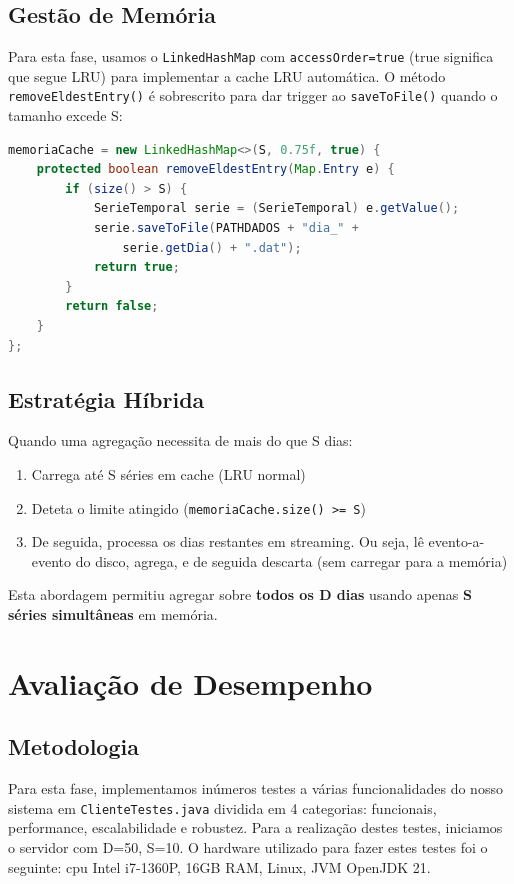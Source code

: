 \documentclass[11pt,a4paper]{article}
\begin{document}
\subsection{Gestão de Memória}

Para esta fase, usamos o \texttt{LinkedHashMap} com \texttt{accessOrder=true} (true significa que segue LRU) para implementar a cache LRU automática. O método \texttt{removeEldestEntry()} é sobrescrito para dar trigger ao \texttt{saveToFile()} quando o tamanho excede S:

\begin{lstlisting}[language=Java]
memoriaCache = new LinkedHashMap<>(S, 0.75f, true) {
    protected boolean removeEldestEntry(Map.Entry e) {
        if (size() > S) {
            SerieTemporal serie = (SerieTemporal) e.getValue();
            serie.saveToFile(PATHDADOS + "dia_" + 
                serie.getDia() + ".dat");
            return true;
        }
        return false;
    }
};
\end{lstlisting}

\subsection{Estratégia Híbrida}

Quando uma agregação necessita de mais do que S dias:
\begin{enumerate}[noitemsep]
    \item Carrega até S séries em cache (LRU normal)
    \item Deteta o limite atingido (\texttt{memoriaCache.size() >= S})
    \item De seguida, processa os dias restantes em streaming. Ou seja, lê evento-a-evento do disco, agrega, e de seguida descarta (sem carregar para a memória)
\end{enumerate}

Esta abordagem permitiu agregar sobre \textbf{todos os D dias} usando apenas \textbf{S séries simultâneas} em memória.

\section{Avaliação de Desempenho}

\subsection{Metodologia}

Para esta fase, implementamos inúmeros testes a várias funcionalidades do nosso sistema em \texttt{ClienteTestes.java} dividida em 4 categorias: funcionais, performance, escalabilidade e robustez. Para a realização destes testes, iniciamos o servidor com D=50, S=10. O hardware utilizado para fazer estes testes foi o seguinte: cpu Intel i7-1360P, 16GB RAM, Linux, JVM OpenJDK 21.
\end{document}
